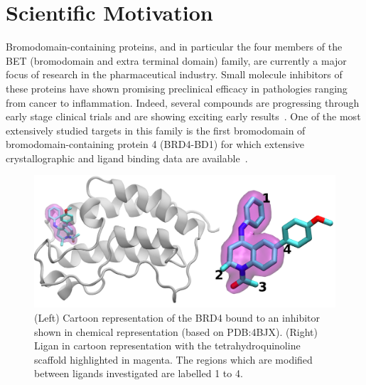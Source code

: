 \documentclass[conference]{IEEEtran}
\begin{document}

\section{Scientific Motivation}\label{sec:motivation}



Bromodomain-containing proteins, and in particular the four members of the BET
(bromodomain and extra terminal domain) family, are currently a major focus of
research in the pharmaceutical industry. Small molecule inhibitors of these
proteins have shown promising preclinical efficacy in pathologies ranging from
cancer to inflammation. Indeed, several compounds are progressing through
early stage clinical trials and are showing exciting early
results~\cite{Theodoulou2016}. One of the most extensively studied targets in
this family is the first bromodomain of bromodomain-containing protein 4
(BRD4-BD1) for which extensive crystallographic and ligand binding data are
available~\cite{Bamborough2012}.

\begin{figure}
  \centering
  \includegraphics[width=1.0\columnwidth]{./brd4.png}
  \caption{(Left) Cartoon representation of the BRD4 bound to an inhibitor shown in 
  chemical representation (based on PDB:4BJX). (Right) Ligan in cartoon representation 
  with the tetrahydroquinoline scaffold highlighted in magenta. The 
  regions which are modified between ligands investigated are labelled 1 to 4.}
  \label{fig:brd4}
  \vspace{-2em}
\end{figure}
\end{document}
